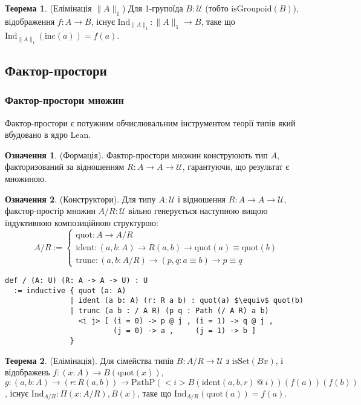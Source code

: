 \documentclass{article}
\theoremstyle{definition}
\newtheorem{theorem}{Теорема}
\newtheorem{definition}{Означення}
\begin{document}
\begin{theorem} (Елімінація \( \| A \|_1 \))
Для 1-групоїда \( B : \mathcal{U} \) (тобто \( \text{isGroupoid}(B) \)),
відображення \( f : A \to B \), існує \( \text{Ind}_{\|A\|_1} : \|A\|_1 \to B \),
таке що \( \text{Ind}_{\|A\|_1}(\text{inc}(a)) = f(a) \).
\end{theorem}

\newpage
\subsection{Фактор-простори}
\subsubsection*{Фактор-простори множин}
Фактор-простори є потужним обчислювальним інструментом теорії типів який
вбудовано в ядро Lean.
\begin{definition} (Формація).
Фактор-простори множин конструюють тип \( A \), факторизований за
відношенням \( R : A \to A \to \mathcal{U} \), гарантуючи, що результат є множиною.
\end{definition}

\begin{definition} (Конструктори).
Для типу \( A : \mathcal{U} \) і відношення \( R : A \to A \to \mathcal{U} \),
факстор-простір множин \( A / R : \mathcal{U} \) вільно генерується наступною
вищою індуктивною композиційною структурою:
\[
A / R :=
\begin{cases}
\text{quot} : A \to A / R \\
\text{ident} : (a, b : A) \to R(a,b) \to \text{quot}(a) \equiv \text{quot}(b) \\
\text{trunc} : (a, b : A / R) \to (p, q : a \equiv b) \to p \equiv q
\end{cases}
\]
\begin{lstlisting}[mathescape=true]
def / (A: U) (R: A -> A -> U) : U
  := inductive { quot (a: A)
               | ident (a b: A) (r: R a b) : quot(a) $\equiv$ quot(b)
               | trunc (a b : / A R) (p q : Path (/ A R) a b)
                 <i j> [ (i = 0) -> p @ j , (i = 1) -> q @ j ,
                         (j = 0) -> a ,     (j = 1) -> b ]
               }
\end{lstlisting}
\end{definition}

\begin{theorem} (Елімінація).
Для сімейства типів \( B : A/R \to \mathcal{U} \) з \( \text{isSet}(B x) \),
і відображень \( f : (x : A) \to B(\text{quot}(x)) \),
\( g : (a, b : A) \to (r : R(a,b)) \to \text{PathP} (<i> B(\text{ident}(a,b,r)\ @\ i)) (f(a)) (f(b)) \),
існує \( \text{Ind}_{A/R} : \Pi (x: A/R), B(x) \), таке що \( \text{Ind}_{A/R}(\text{quot}(a)) = f(a) \).
\end{theorem}
\end{document}
